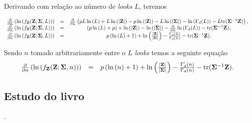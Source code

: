 \documentclass[12pt,a4paper]{article}
\begin{document}
Derivando com relação ao número de {\it looks} $L$, teremos

\begin{equation}\label{sec71eqn3}
\begin{array}{ccc}
	\frac{\partial}{\partial L}\left(\ln{\left(f_{{\bf Z}}({\bf Z};{\bf \Sigma},L)\right)}\right)&=&\frac{\partial}{\partial L}\left(pL\ln{\left(L\right)}+L\ln{\left( |{\bf Z}|\right)}-p\ln{\left( |{\bf Z}|\right)} - L \ln{\left(|{\bf \Sigma}|\right)}-\ln{\left(\Gamma_d(L)\right)}-L\mathrm{tr}{({\bf \Sigma}^{-1}{\bf Z})}\right), \\
	\frac{\partial}{\partial L}\left(\ln{\left(f_{{\bf Z}}({\bf Z};{\bf \Sigma},L)\right)}\right)&=&\left(p\ln{\left(L\right)}+p\right)+\ln{\left( |{\bf Z}|\right)} - \ln{\left(|{\bf \Sigma}|\right)}-\frac{\partial}{\partial L}\ln{\left(\Gamma_d(L)\right)}-\mathrm{tr}{({\bf \Sigma}^{-1}{\bf Z})}, \\
	\frac{\partial}{\partial L}\left(\ln{\left(f_{{\bf Z}}({\bf Z};{\bf \Sigma},L)\right)}\right)&=&p\left(\ln{\left(L\right)}+1\right)+\ln{\left(\frac{|{\bf Z}|}{|\bf \Sigma|}\right)}-\frac{\Gamma^{\prime}_d(L)}{\Gamma_d(L)}-\mathrm{tr}{({\bf \Sigma}^{-1}{\bf Z})}. \\
\end{array}
\end{equation}

Sendo $n$ tomado arbitrariamente entre o $L$ {\it looks} temos a seguinte equação
\begin{equation}\label{sec71eqn4}
\begin{array}{ccc}
	\frac{\partial}{\partial n}\left(\ln{\left(f_{{\bf Z}}({\bf Z};{\bf \Sigma},n)\right)}\right)&=&p\left(\ln{\left(n\right)}+1\right)+\ln{\left(\frac{|{\bf Z}|}{|\bf \Sigma|}\right)}-\frac{\Gamma^{\prime}_d(n)}{\Gamma_d(n)}-\mathrm{tr}{({\bf \Sigma}^{-1}{\bf Z})}. \\
\end{array}
\end{equation}



\subsection{Estudo do livro  \cite{lee2009polarimetric}}.
\end{document}
